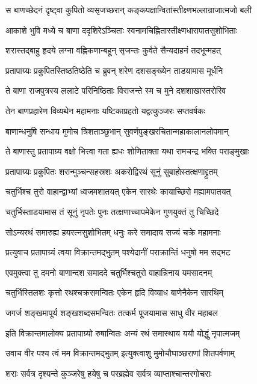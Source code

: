\twolineshloka
{स बाणच्छेदनं दृष्ट्वा कुपितो व्यसृजच्छरान्}
{कङ्कपक्षान्वितांस्तीक्ष्णभल्लान्राजात्मजो बली}%

\twolineshloka
{आकाशे भुवि मध्ये च बाणा ददृशिरेऽञ्चिताः}
{स्वनामचिह्नितास्तीक्ष्णधारापातसुशोभिताः}%

\twolineshloka
{शरास्तद्बाहु हृदये लग्ना वह्निकणान्बहून्}
{सृजन्तः कुर्वते सैन्यदाहनं तदभून्महत्}%

\twolineshloka
{प्रतापाग्र्यः प्रकुपितस्तिष्ठतिष्ठेति च ब्रुवन्}
{शरेण दशसङ्ख्येन ताडयामास मूर्धनि}%

\twolineshloka
{ते बाणा राजपुत्रस्य ललाटे परिनिष्ठिताः}
{विराजन्ते स्म च मुने दशशाखास्तरोरिव}%

\twolineshloka
{तेन बाणप्रहारेण विव्यथेन महामनाः}
{यष्टिकाप्रहतो यद्वत्कुञ्जरः सप्तवर्षकः}%

\twolineshloka
{बाणान्धनुषि सन्धाय मुमोच त्रिशताञ्छुभान्}
{सुवर्णपुङ्खरचितान्महाकालानलोपमान्}%

\twolineshloka
{ते बाणास्तु प्रतापाग्र्य वक्षो भित्त्वा गता ह्यधः}
{शोणिताक्ता यथा रामचन्द्र भक्ति पराङ्मुखाः}%

\twolineshloka
{प्रतापाग्र्यः प्रकुपितः शरान्मुञ्चन्सहस्रशः}
{अकरोद्विरथं सूनुं सुबाहोस्तत्क्षणाद्द्रुतम्}%

\twolineshloka
{चतुर्भिश्च तुरो वाहान्द्वाभ्यां ध्वजमशातयत्}
{एकेन सारथेः कायाच्छिरो मह्यामपातयत्}%

\twolineshloka
{चतुर्भिस्ताडयामास तं सूनुं नृपतेः पुनः}
{तत्क्षणाच्चापमेकेन गुणयुक्तं तु चिच्छिदे}%

\twolineshloka
{सोऽन्यरथं समारुह्य हयरत्नसुशोभितम्}
{धनुः करे समादाय सज्यं चक्रे महामनाः}%

\twolineshloka
{प्रत्युवाच प्रतापाग्र्यं त्वया विक्रान्तमद्भुतम्}
{पश्येदानीं पराक्रान्तिं धनुषो मम सद्भट}%

\twolineshloka
{एवमुक्त्वा तु दमनो बाणान्दश समाददे}
{चतुर्भिश्चतुरो वाहान्निनाय यमसादनम्}%

\twolineshloka
{चतुर्भिस्तिलशः कृत्तो रथश्चक्रसमन्वितः}
{एकेन हृदि विव्याध बाणेनैकेन सारथिम्}%

\twolineshloka
{जगर्ज शङ्खमापूर्य शङ्खशब्दसमन्वितः}
{तत्कर्म पूजयामास साधु वीर महाबल}%

\twolineshloka
{इति विक्रान्तमालोक्य प्रतापाग्र्यो रुषान्वितः}
{अन्यं रथं समास्थाय ययौ योद्धुं नृपात्मजम्}%

\twolineshloka
{उवाच वीर पश्य त्वं मम विक्रान्तमद्भुतम्}
{इत्युक्त्वाशु मुमोचौघाञ्छराणां शितपर्वणाम्}%

\twolineshloka
{शराः सर्वत्र दृश्यन्ते कुञ्जरेषु हयेषु च}
{परब्रह्मेव सर्वत्र व्याप्ताश्चान्तरगोचराः}%

